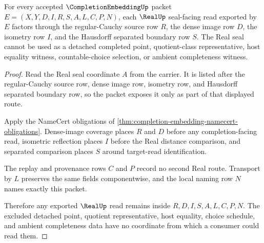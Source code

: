 \begin{theorem}
\label{thm:completion-embedding-real-seal-nonescape}
For every accepted $\CompletionEmbeddingUp$ packet $E=(X,Y,D,I,R,S,A,L,C,P,N)$, each $\RealUp$ seal-facing read exported by $E$ factors through the regular-Cauchy source row $R$, the dense image row $D$, the isometry row $I$, and the Hausdorff separated boundary row $S$. The Real seal cannot be used as a detached completed point, quotient-class representative, host equality witness, countable-choice selection, or ambient completeness witness.
\end{theorem}
\begin{proof}
Read the Real seal coordinate $A$ from the carrier. It is listed after the regular-Cauchy source row, dense image row, isometry row, and Hausdorff separated boundary row, so the packet exposes it only as part of that displayed route.

Apply the NameCert obligations of \autoref{thm:completion-embedding-namecert-obligations}. Dense-image coverage places $R$ and $D$ before any completion-facing read, isometric reflection places $I$ before the Real distance comparison, and separated comparison places $S$ around target-read identification.

The replay and provenance rows $C$ and $P$ record no second Real route. Transport by $L$ preserves the same fields componentwise, and the local naming row $N$ names exactly this packet.

Therefore any exported $\RealUp$ read remains inside $R,D,I,S,A,L,C,P,N$. The excluded detached point, quotient representative, host equality, choice schedule, and ambient completeness data have no coordinate from which a consumer could read them.
\end{proof}

